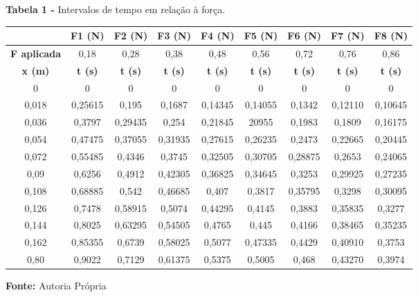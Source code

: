 \documentclass[article,12pt,oneside,a4paper,brazil]{abntex2}
\begin{document}
	\begin{table}[h!]
		\centering
		\begin{adjustwidth}{0cm}{0cm}
			\begin{flushleft}
				\textbf{Tabela 1 -} Intervalos de tempo em relação à força.
			\end{flushleft}
		\end{adjustwidth}
	
		\label{tab:intervalos-forca}
		\begin{tabular}{|c|c|c|c|c|c|c|c|c|}
			\hline
			& \textbf{F1 (N)} & \textbf{F2 (N)} & \textbf{F3 (N)} & \textbf{F4 (N)} & \textbf{F5 (N)} & \textbf{F6 (N)} & \textbf{F7 (N)} & \textbf{F8 (N)} \\ \hline
			\textbf{F aplicada} & 0,18 & 0,28 & 0,38 & 0,48 & 0,56 & 0,72 & 0,76 & 0,86 \\ \hline
			\textbf{x (m)} & \textbf{t (s)} & \textbf{t (s)} & \textbf{t (s)} & \textbf{t (s)} & \textbf{t (s)} & \textbf{t (s)} & \textbf{t (s)} & \textbf{t (s)} \\ \hline
			0 & 0 & 0 & 0 & 0 & 0 & 0 & 0 & 0 \\ \hline
			0,018 & 0,25615 & 0,195 & 0,1687 & 0,14345 & 0,14055 & 0,1342 & 0,12110 & 0,10645 \\ \hline
			0,036 & 0,3797 & 0,29435 & 0,254 & 0,21845 & 20955 & 0,1983 & 0,1809 & 0,16175 \\ \hline
			0,054 & 0,47475 & 0,37055 & 0,31935 & 0,27615 & 0,26235 & 0,2473 & 0,22665 & 0,20445 \\ \hline
			0,072 & 0,55485 & 0,4346 & 0,3745 & 0,32505 & 0,30705 & 0,28875 & 0,2653 & 0,24065 \\ \hline
			0,09 & 0,6256 & 0,4912 & 0,42305 & 0,36825 & 0,34645 & 0,3253 & 0,29925 & 0,27235 \\ \hline
			0,108 & 0,68885 & 0,542 & 0,46685 & 0,407 & 0,3817 & 0,35795 & 0,3298 & 0,30095 \\ \hline
			0,126 & 0,7478 & 0,58915 & 0,5074 & 0,44295 & 0,4145 & 0,3883 & 0,35835 & 0,3277 \\ \hline
			0,144 & 0,8025 & 0,63295 & 0,54505 & 0,4765 & 0,445 & 0,4166 & 0,38465 & 0,35235 \\ \hline
			0,162 & 0,85355 & 0,6739 & 0,58025 & 0,5077 & 0,47335 & 0,4429 & 0,40910 & 0,3753 \\ \hline
			0,80 & 0,9022 & 0,7129 & 0,61375 & 0,5375 & 0,5005 & 0,468 & 0,43270 & 0,3974 \\ \hline
		\end{tabular}
		
		\begin{adjustwidth}{0cm}{0cm}
			\begin{flushleft}
				\textbf{Fonte: }Autoria Própria
			\end{flushleft}
		\end{adjustwidth}
	\end{table}
\end{document}
